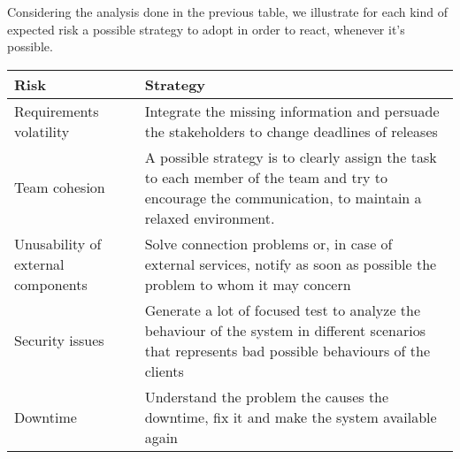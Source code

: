 Considering the analysis done in the previous table, we illustrate for each kind of expected risk a possible strategy to adopt in order to react, whenever it’s possible.
\begin{longtable}{ll}
\textbf{Risk}                & \textbf{Strategy}  \\ \hline
\begin{minipage}[t]{0.5\textwidth}
Requirements volatility
\end{minipage} &
\begin{minipage}[t]{0.45\textwidth}
Integrate the missing information and persuade the stakeholders to change deadlines of releases
\end{minipage} \\ \hline
\begin{minipage}[t]{0.5\textwidth}
Team cohesion
\end{minipage} &
\begin{minipage}[t]{0.45\textwidth}
A possible strategy is to clearly assign the task to each member of the team and try to encourage the communication, to maintain a relaxed environment.
\end{minipage} \\ \hline
\begin{minipage}[t]{0.5\textwidth}
Unusability of external components
\end{minipage} &
\begin{minipage}[t]{0.45\textwidth}
Solve connection problems or, in case of external services, notify as soon as possible the problem to whom it may concern
\end{minipage} \\ \hline
\begin{minipage}[t]{0.5\textwidth}
Security issues
\end{minipage} &
\begin{minipage}[t]{0.45\textwidth}
Generate a lot of focused test to analyze the behaviour of the system in different scenarios that represents bad possible behaviours of the clients
\end{minipage} \\ \hline
\begin{minipage}[t]{0.5\textwidth}
Downtime
\end{minipage} &
\begin{minipage}[t]{0.45\textwidth}
Understand the problem the causes the downtime, fix it and make the system available again
\end{minipage} \\ \hline

\end{longtable}
